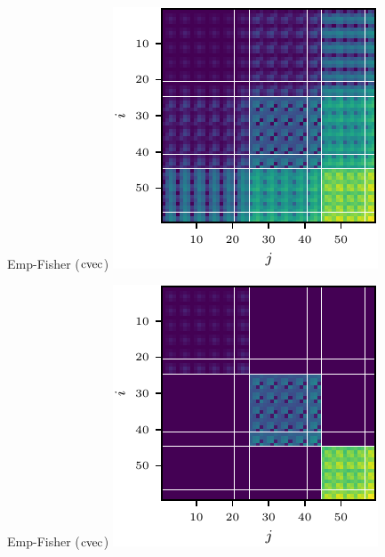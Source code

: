 \begin{figure}[t!]
\begin{minipage}[t]{0.485\linewidth}
  \end{minipage}
  \\  
  \begin{minipage}[t]{0.485\linewidth}
    \centering
    Emp-Fisher ($\operatorname{cvec}$)\vspace{1ex}
    \includegraphics[width=0.8\linewidth]{../kfs/plots/synthetic_cvec_empfisher_full.pdf}
  \end{minipage}
  \hfill
  \begin{minipage}[t]{0.485\linewidth}
    \centering
    Emp-Fisher ($\operatorname{cvec}$)\vspace{1ex}
    \includegraphics[width=0.8\linewidth]{../kfs/plots/synthetic_cvec_empfisher_kfac.pdf}

\end{minipage}
\end{figure}
